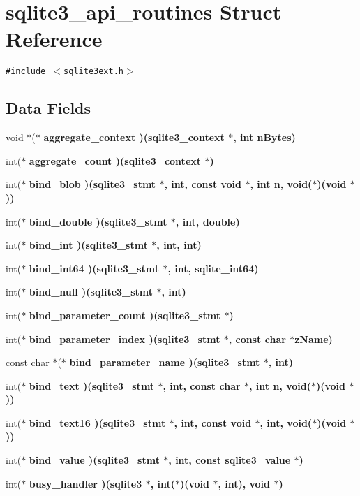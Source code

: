 \section{sqlite3\_\-api\_\-routines Struct Reference}
\label{structsqlite3__api__routines}
{\tt \#include $<$sqlite3ext.h$>$}

\subsection*{Data Fields}
\begin{CompactItemize}
\item 
void $\ast$($\ast$ \bf{aggregate\_\-context} )(\bf{sqlite3\_\-context} $\ast$, int n\-Bytes)
\item 
int($\ast$ \bf{aggregate\_\-count} )(\bf{sqlite3\_\-context} $\ast$)
\item 
int($\ast$ \bf{bind\_\-blob} )(\bf{sqlite3\_\-stmt} $\ast$, int, const void $\ast$, int n, void($\ast$)(void $\ast$))
\item 
int($\ast$ \bf{bind\_\-double} )(\bf{sqlite3\_\-stmt} $\ast$, int, double)
\item 
int($\ast$ \bf{bind\_\-int} )(\bf{sqlite3\_\-stmt} $\ast$, int, int)
\item 
int($\ast$ \bf{bind\_\-int64} )(\bf{sqlite3\_\-stmt} $\ast$, int, \bf{sqlite\_\-int64})
\item 
int($\ast$ \bf{bind\_\-null} )(\bf{sqlite3\_\-stmt} $\ast$, int)
\item 
int($\ast$ \bf{bind\_\-parameter\_\-count} )(\bf{sqlite3\_\-stmt} $\ast$)
\item 
int($\ast$ \bf{bind\_\-parameter\_\-index} )(\bf{sqlite3\_\-stmt} $\ast$, const char $\ast$z\-Name)
\item 
const char $\ast$($\ast$ \bf{bind\_\-parameter\_\-name} )(\bf{sqlite3\_\-stmt} $\ast$, int)
\item 
int($\ast$ \bf{bind\_\-text} )(\bf{sqlite3\_\-stmt} $\ast$, int, const char $\ast$, int n, void($\ast$)(void $\ast$))
\item 
int($\ast$ \bf{bind\_\-text16} )(\bf{sqlite3\_\-stmt} $\ast$, int, const void $\ast$, int, void($\ast$)(void $\ast$))
\item 
int($\ast$ \bf{bind\_\-value} )(\bf{sqlite3\_\-stmt} $\ast$, int, const \bf{sqlite3\_\-value} $\ast$)
\item 
int($\ast$ \bf{busy\_\-handler} )(\bf{sqlite3} $\ast$, int($\ast$)(void $\ast$, int), void $\ast$)
\item 

\end{CompactItemize}
